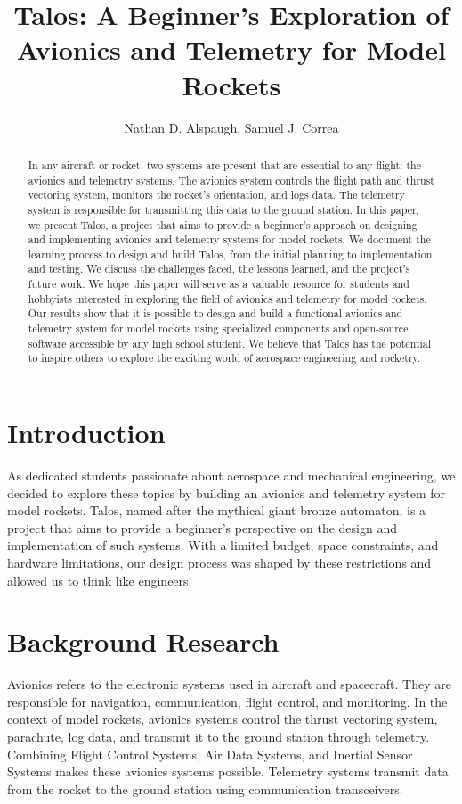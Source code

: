 \documentclass{article}
\title{Talos: A Beginner's Exploration of Avionics and Telemetry for Model Rockets}
\author{Nathan D. Alspaugh, Samuel J. Correa}
\begin{document}
\maketitle

\begin{abstract}
      \noindent In any aircraft or rocket, two systems are present that are essential to any flight: the avionics and telemetry systems. The avionics system controls the flight path and thrust vectoring system, monitors the rocket's orientation, and logs data. The telemetry system is responsible for transmitting this data to the ground station. In this paper, we present Talos, a project that aims to provide a beginner's approach on designing and implementing avionics and telemetry systems for model rockets. We document the learning process to design and build Talos, from the initial planning to implementation and testing. We discuss the challenges faced, the lessons learned, and the project's future work. We hope this paper will serve as a valuable resource for students and hobbyists interested in exploring the field of avionics and telemetry for model rockets. Our results show that it is possible to design and build a functional avionics and telemetry system for model rockets using specialized components and open-source software accessible by any high school student. We believe that Talos has the potential to inspire others to explore the exciting world of aerospace engineering and rocketry.
\end{abstract}

\section{Introduction}

\qquad As dedicated students passionate about aerospace and mechanical engineering, we decided to explore these topics by building an avionics and telemetry system for model rockets. Talos, named after the mythical giant bronze automaton, is a project that aims to provide a beginner's perspective on the design and implementation of such systems. With a limited budget, space constraints, and hardware limitations, our design process was shaped by these restrictions and allowed us to think like engineers.
\section{Background Research}

\qquad Avionics refers to the electronic systems used in aircraft and spacecraft. They are responsible for navigation, communication, flight control, and monitoring. In the context of model rockets, avionics systems control the thrust vectoring system, parachute, log data, and transmit it to the ground station through telemetry. Combining Flight Control Systems, Air Data Systems, and Inertial Sensor Systems makes these avionics systems possible. Telemetry systems transmit data from the rocket to the ground station using communication transceivers.
\end{document}
